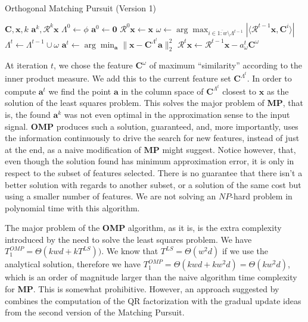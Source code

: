 \documentclass[12pt,a4paper,oneside,english]{UPBThesis}
\newcommand{\hcrange}[2]{\overline{{#1}\colon\!\!{#2}}}
\begin{document}
\begin{algorithm}
\caption{Orthogonal Matching Pursuit (Version 1)}
\label{algo:OrthogonalMatchingPursuitMethodV1}
\begin{algorithmic}
\Require $\textbf{C},\textbf{x},k$
\Ensure $\textbf{a}^k,\mathcal{R}^k\textbf{x}$
\State $\Lambda^0 \gets \phi$
\State $\textbf{a}^0 \gets \textbf{0}$
\State $\mathcal{R}^0\textbf{x} \gets \textbf{x}$
\For {$t = \hcrange{1}{k}$}
\State $\omega \gets \arg \max_{i \in \hcrange{1}{w} \setminus \Lambda^{t-1}} \left| \langle \mathcal{R}^{t-1}\textbf{x} , \textbf{C}^i \rangle \right|$
\State $\Lambda^t \gets \Lambda^{t-1} \cup \omega$
\State $\textbf{a}^t \gets \arg\min_{\textbf{a}} {\| \textbf{x} - \textbf{C}^{\Lambda^t}\textbf{a} \|_2^2}$
\State $\mathcal{R}^t\textbf{x} \gets \mathcal{R}^{t-1}\textbf{x} - a_\omega^t\textbf{C}^\omega$
\EndFor
\end{algorithmic}
\end{algorithm}

At iteration $t$, we chose the feature $\textbf{C}^\omega$ of maximum ``similarity'' according to the inner product measure. We add this to the current feature set $\textbf{C}^{\Lambda^t}$. In order to compute $\textbf{a}^t$ we find the point $\textbf{a}$ in the column space of $\textbf{C}^{\Lambda^t}$ closest to $\textbf{x}$ as the solution of the least squares problem. This solves the major problem of \textbf{MP}, that is, the found $\textbf{a}^k$ was not even optimal in the approximation sense to the input signal. \textbf{OMP} produces such a solution, guaranteed, and, more importantly, uses the information continuously to drive the search for new features, instead of just at the end, as a naive modification of $\textbf{MP}$ might suggest. Notice however, that, even though the solution found has minimum approximation error, it is only in respect to the subset of features selected. There is no guarantee that there isn't a better solution with regards to another subset, or a solution of the same cost but using a smaller number of features. We are not solving an $NP$-hard problem in polynomial time with this algorithm.

The major problem of the \textbf{OMP} algorithm, as it is, is the extra complexity introduced by the need to solve the least squares problem. We have $T_1^{OMP} = \Theta(kwd + kT^{LS}))$. We know that $T^{LS} = \Theta(w^2d)$ if we use the analytical solution, therefore we have $T_1^{OMP} = \Theta(kwd + kw^2d) = \Theta(kw^2d)$, which is an order of magnitude larger than the naive algorithm time complexity for \textbf{MP}. This is somewhat prohibitive. However, an approach suggested by \cite{matchingpursuit2,pursuitdifferences} combines the computation of the QR factorization with the gradual update ideas from the second version of the Matching Pursuit.
\end{document}
